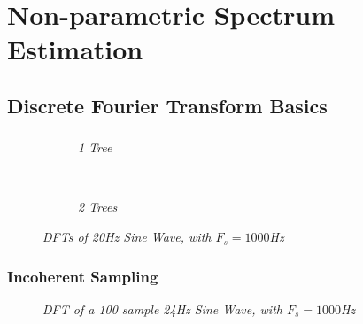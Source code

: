 \documentclass[./main.tex]{subfiles}
\begin{document}
\section{Non-parametric Spectrum Estimation}

\subsection{Discrete Fourier Transform Basics}

\subsubsection{}

\begin{figure}[h]
      \centering
      \begin{subfigure}[b]{0.49\textwidth}
         \resizebox{\textwidth}{!}{}
  		\caption{\textit{1 Tree}}
  		\label{fig:1_1_b_100}
      \end{subfigure}
      ~ %
      \begin{subfigure}[b]{0.49\textwidth}
         \resizebox{\textwidth}{!}{}
 			\caption{\textit{2 Trees}}
  		\label{fig:1_1_b_1000}
      \end{subfigure}
	\label{fig:1_1_b}
	\caption{\textit{DFTs of 20Hz Sine Wave, with $ F_s = 1000 $Hz}}
  \end{figure}

\subsubsection{Incoherent Sampling}

\begin{figure}[h]
	\centering 
	\resizebox{0.7\textwidth}{!}{}
	\caption{\textit{DFT of a 100 sample 24Hz Sine Wave, with $ F_s = 1000 $Hz}}
	\label{fig:q5_4}
\end{figure}



\end{document}

